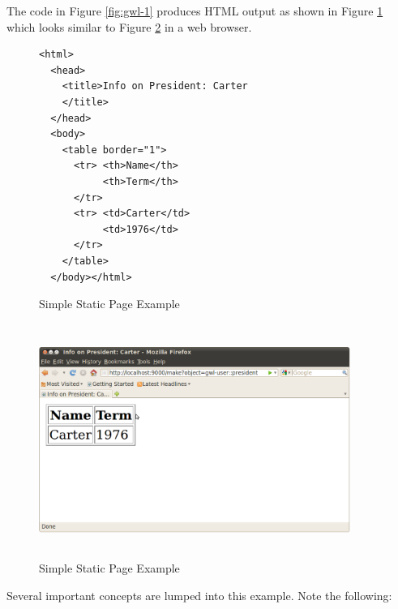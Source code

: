 \documentclass [11pt]{book}
\begin{document}
The code in Figure 
\ref{fig:gwl-1} produces HTML output as shown in Figure 
\ref{fig:gwl-1-html} which looks similar to Figure 
\ref{fig:gwl-1-image} in a web browser.
\begin{figure}
\begin{lrbox}{\boxedverb}
\begin{minipage}{\linewidth}

\begin{verbatim}
<html>
  <head>
    <title>Info on President: Carter
    </title>
  </head>
  <body>
    <table border="1">
      <tr> <th>Name</th>
           <th>Term</th>
      </tr>
      <tr> <td>Carter</td>
           <td>1976</td>
      </tr>
    </table>
  </body></html>

\end{verbatim}
\end{minipage}
\end{lrbox}
\fbox{\usebox{\boxedverb}}

\caption{Simple Static Page Example}

\label{fig:gwl-1-html}

\end{figure}

\begin{figure}
\begin{center}
\includegraphics[width=4in,height=3in]{../images/gwl-1.png}
\end{center}

\caption{Simple Static Page Example}

\label{fig:gwl-1-image}

\end{figure}




Several important concepts are lumped into this
      example. Note the following:
\end{document}
